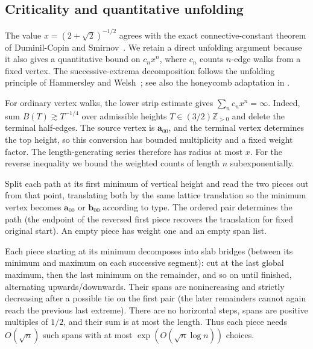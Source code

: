 \subsection{Criticality and quantitative unfolding}\label{c2:unfolding}

The value $x=(2+\sqrt2)^{-1/2}$ agrees with the exact connective-constant
 theorem of Duminil-Copin and Smirnov~\cite[Theorem~1]{DuminilCopinSmirnov2012}.
We retain a direct unfolding argument because it also gives a quantitative
bound on $c_nx^n$, where $c_n$ counts $n$-edge walks from a fixed vertex.
The successive-extrema decomposition follows the unfolding principle of
Hammersley and Welsh~\cite{HammersleyWelsh1962}; see also the honeycomb
adaptation in \cite[Section~3]{DuminilCopinSmirnov2012}.

For ordinary vertex walks, the lower strip estimate gives
$\sum_n c_nx^n=\infty$.  Indeed, sum $B(T)\gtrsim T^{-1/4}$ over
admissible heights $T\in(3/2)\mathbb Z_{>0}$ and delete the terminal
half-edges.  The source vertex is $\mathbf a_{00}$, and the terminal
vertex determines the top height, so this conversion has bounded
multiplicity and a fixed weight factor.  The length-generating series
therefore has radius at most $x$.
For the reverse inequality we bound the weighted counts of length $n$
subexponentially.

Split each path at its first minimum of vertical height and read the two pieces out from that point, translating both by the same lattice translation so the minimum vertex becomes \(\mathbf a_{00}\) or \(\mathbf b_{00}\) according to type. The ordered pair determines the path (the endpoint of the reversed first piece recovers the translation for fixed original start). An empty piece has weight one and an empty span list.

Each piece starting at its minimum decomposes into slab bridges (between its minimum and maximum on each successive segment): cut at the last global maximum, then the last minimum on the remainder, and so on until finished, alternating upwards/downwards. Their spans are nonincreasing and strictly decreasing after a possible tie on the first pair (the later remainders cannot again reach the previous last extreme). There are no horizontal steps, spans are positive multiples of \(1/2\), and their sum is at most the length. Thus each piece needs \(O(\sqrt n)\) such spans with at most \(\exp(O(\sqrt n\log n))\) choices.

